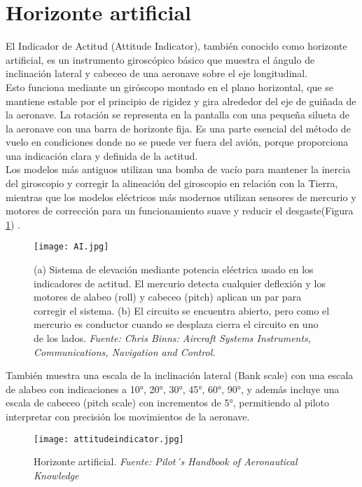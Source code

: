 \section{Horizonte artificial}

El Indicador de Actitud (Attitude Indicator), también conocido como horizonte artificial, es un instrumento giroscópico básico que muestra el ángulo de inclinación lateral y cabeceo de una aeronave sobre el eje longitudinal.\\

Esto funciona mediante un giróscopo montado en el plano horizontal, que se mantiene estable por el principio de rigidez y gira alrededor del eje de guiñada de la aeronave. La rotación se representa en la pantalla con una pequeña silueta de la aeronave con una barra de horizonte fija. Es una parte esencial del método de vuelo en condiciones donde no se puede ver fuera del avión, porque proporciona una indicación clara y definida de la actitud.\\ 

Los modelos más antiguos utilizan una bomba de vacío para mantener la inercia del giroscopio y corregir la alineación del giroscopio en relación con la Tierra, mientras que los modelos eléctricos más modernos utilizan sensores de mercurio y motores de corrección para un funcionamiento suave y reducir el desgaste(Figura \ref{fig:placeholderseywgogogogog})  .\\

\begin{figure}[H] 
	\centering
	\texttt{[image: AI.jpg]}
	\caption{\centering (a) Sistema de elevación mediante potencia eléctrica usado en los indicadores de actitud. El mercurio detecta cualquier deflexión y los motores de alabeo (roll) y cabeceo (pitch) aplican un par para corregir el sistema. (b) El circuito se encuentra abierto, pero como el mercurio es conductor cuando se desplaza cierra el circuito en uno de los lados. \textit{ Fuente: Chris Binns: Aircraft Systems Instruments, Communications, Navigation and Control.}}
	\label{fig:placeholderseywgogogogog}
\end{figure}


También muestra una escala de la inclinación lateral (Bank scale) con una escala de alabeo con indicaciones a 10°, 20°, 30°, 45°, 60°, 90°, y además incluye una escala de cabeceo (pitch scale) con incrementos de 5°, permitiendo al piloto interpretar con precisión los movimientos de la aeronave.
\begin{figure}[H]
    \centering
    \texttt{[image: attitudeindicator.jpg]}
    \caption{\centering Horizonte artificial.\textit{ Fuente: Pilot´s Handbook of Aeronautical Knowledge}}
    \label{fig:placeholder}
\end{figure}

